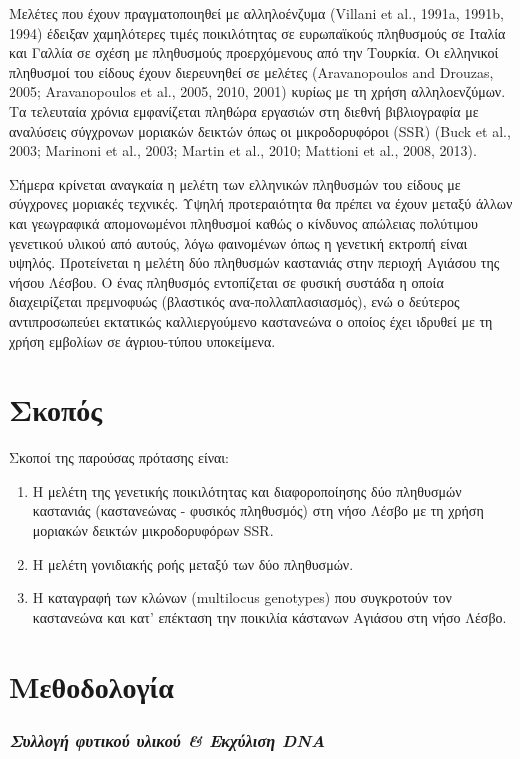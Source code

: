 \documentclass[12pt,a4paper,]{report}
\begin{document}
Μελέτες που έχουν πραγματοποιηθεί με αλληλοένζυμα (Villani et al.,
1991a, 1991b, 1994) έδειξαν χαμηλότερες τιμές ποικιλότητας σε
ευρωπαϊκούς πληθυσμούς σε Ιταλία και Γαλλία σε σχέση με πληθυσμούς
προερχόμενους από την Τουρκία. Οι ελληνικοί πληθυσμοί του είδους έχουν
διερευνηθεί σε μελέτες (Aravanopoulos and Drouzas, 2005; Aravanopoulos
et al., 2005, 2010, 2001) κυρίως με τη χρήση αλληλοενζύμων. Τα τελευταία
χρόνια εμφανίζεται πληθώρα εργασιών στη διεθνή βιβλιογραφία με αναλύσεις
σύγχρονων μοριακών δεικτών όπως οι μικροδορυφόροι (SSR) (Buck et al.,
2003; Marinoni et al., 2003; Martin et al., 2010; Mattioni et al., 2008,
2013).

Σήμερα κρίνεται αναγκαία η μελέτη των ελληνικών πληθυσμών του είδους με
σύγχρονες μοριακές τεχνικές. Υψηλή προτεραιότητα θα πρέπει να έχουν
μεταξύ άλλων και γεωγραφικά απομονωμένοι πληθυσμοί καθώς ο κίνδυνος
απώλειας πολύτιμου γενετικού υλικού από αυτούς, λόγω φαινομένων όπως η
γενετική εκτροπή είναι υψηλός. Προτείνεται η μελέτη δύο πληθυσμών
καστανιάς στην περιοχή Αγιάσου της νήσου Λέσβου. Ο ένας πληθυσμός
εντοπίζεται σε φυσική συστάδα η οποία διαχειρίζεται πρεμνοφυώς
(βλαστικός ανα-πολλαπλασιασμός), ενώ ο δεύτερος αντιπροσωπεύει εκτατικώς
καλλιεργούμενο καστανεώνα ο οποίος έχει ιδρυθεί με τη χρήση εμβολίων σε
άγριου-τύπου υποκείμενα.

\section{Σκοπός}

Σκοποί της παρούσας πρότασης είναι:

\begin{enumerate}
\def\labelenumi{\arabic{enumi}.}
\item
  Η μελέτη της γενετικής ποικιλότητας και διαφοροποίησης δύο πληθυσμών
  καστανιάς (καστανεώνας - φυσικός πληθυσμός) στη νήσο Λέσβο με τη χρήση
  μοριακών δεικτών μικροδορυφόρων SSR.
\item
  Η μελέτη γονιδιακής ροής μεταξύ των δύο πληθυσμών.
\item
  Η καταγραφή των κλώνων (multilocus genotypes) που συγκροτούν τον
  καστανεώνα και κατ' επέκταση την ποικιλία κάστανων Αγιάσου στη νήσο
  Λέσβο.
\end{enumerate}

\section{Μεθοδολογία}

\hypertarget{----dna}{%
\subsubsection{\texorpdfstring{\emph{Συλλογή φυτικού υλικού \& Εκχύλιση
DNA}}{Συλλογή φυτικού υλικού \& Εκχύλιση DNA}}\label{----dna}}
\end{document}
